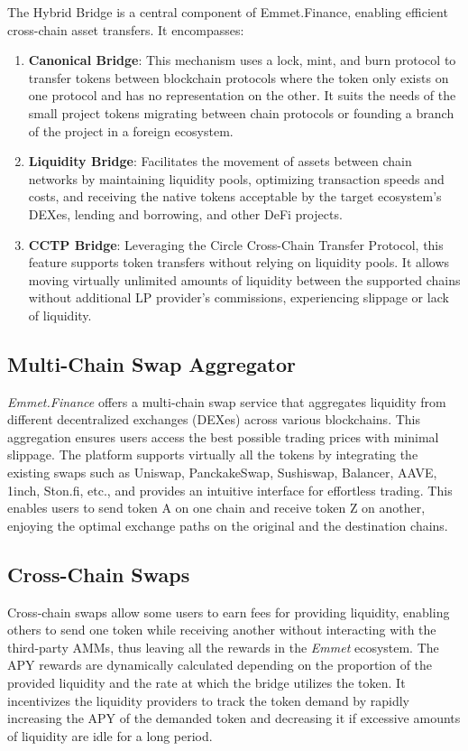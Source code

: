\documentclass[12pt, a4paper]{article}
\begin{document}
The Hybrid Bridge is a central component of Emmet.Finance, enabling efficient cross-chain asset transfers. It encompasses:

\begin{enumerate}
    \item \textbf{Canonical Bridge}: This mechanism uses a lock, mint, and burn protocol to transfer tokens between blockchain protocols where the token only exists on one protocol and has no representation on the other. It suits the needs of the small project tokens migrating between chain protocols or founding a branch of the project in a foreign ecosystem.
    \item \textbf{Liquidity Bridge}: Facilitates the movement of assets between chain networks by maintaining liquidity pools, optimizing transaction speeds and costs, and receiving the native tokens acceptable by the target ecosystem’s DEXes, lending and borrowing, and other DeFi projects.
    \item \textbf{CCTP Bridge}: Leveraging the Circle Cross-Chain Transfer Protocol, this feature supports token transfers without relying on liquidity pools. It allows moving virtually unlimited amounts of liquidity between the supported chains without additional LP provider’s commissions, experiencing slippage or lack of liquidity.
\end{enumerate}

\subsection{Multi-Chain Swap Aggregator}

\textit{Emmet.Finance} offers a multi-chain swap service that aggregates liquidity from different decentralized exchanges (DEXes) across various blockchains. This aggregation ensures users access the best possible trading prices with minimal slippage. The platform supports virtually all the tokens by integrating the existing swaps such as Uniswap, PanckakeSwap, Sushiswap, Balancer, AAVE, 1inch, Ston.fi, etc., and provides an intuitive interface for effortless trading. This enables users to send token A on one chain and receive token Z on another, enjoying the optimal exchange paths on the original and the destination chains. 

\subsection{Cross-Chain Swaps}

Cross-chain swaps allow some users to earn fees for providing liquidity, enabling others to send one token while receiving another without interacting with the third-party AMMs, thus leaving all the rewards in the \textit{Emmet} ecosystem. The APY rewards are dynamically calculated depending on the proportion of the provided liquidity and the rate at which the bridge utilizes the token. It incentivizes the liquidity providers to track the token demand by rapidly increasing the APY of the demanded token and decreasing it if excessive amounts of liquidity are idle for a long period.
\end{document}
